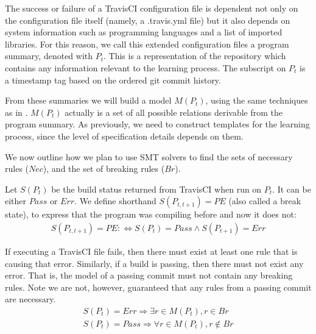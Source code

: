 The success or failure of a TravisCI configuration file is dependent
not only on the configuration file itself (namely, a .travis.yml file) but it also depends on system information such as programming languages and a list of imported libraries.
For this reason, we call this extended configuration files a program summary, denoted with $P_t$. This is a representation 
of the repository which contains any information 
relevant to the learning process.
The subscript on $P_t$ is a timestamp tag based on 
the ordered git commit history.


From these summaries we will build a model $M(P_t)$, using the same techniques as in 
\app. $M(P_t)$ actually is a set of all possible relations derivable 
from the program summary. As previously, we need to construct templates for the 
learning process, since the level of specification details depends on them.

We now outline how we plan to use SMT solvers to find the sets of necessary rules ($Nec$), and the set of breaking rules ($Br$).

Let $S(P_t)$ be the build status returned from TravisCI when run on $P_t$.
It can be either $Pass$ or $Err$. We define shorthand $S(P_{t,t+1}) = PE$ (also called a break state), to 
express that the program was compiling before and now it does not:
\begin{align*}
  S(P_{t,t+1}) = PE :\Leftrightarrow S(P_t)=Pass \land S(P_{t+1})=Err 
\end{align*}


If executing a TravisCI file fails, then there must exist at least one rule that is
causing that error. Similarly, if a build is passing, then there must not exist any error.
That is, the model of a passing commit must not contain any breaking rules.
Note we are not, however, guaranteed that any rules from a passing commit are necessary.
\begin{align}
  S(P_t) = Err \Rightarrow \exists r \in  M (P_t), r \in Br \label{eq:E}\\
  S(P_t) = Pass \Rightarrow \forall r \in  M (P_t), r \notin Br \label{eq:P}
\end{align}


